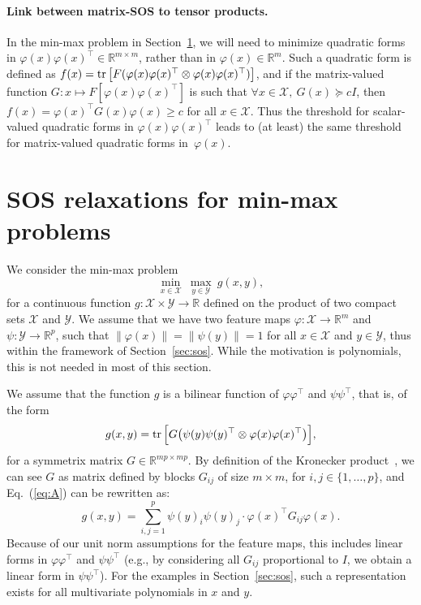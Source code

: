 \documentclass[11pt]{article}
\newcommand{\BEQ}{\begin{equation}}
\newcommand{\EEQ}{\end{equation}}
\newcommand{\tr}{\mathop{ \rm tr}}
\newcommand{\idm}{I}
\newcommand{\rb}{\mathbb{R}}
\newcommand{\mysec}[1]{Section~\ref{sec:#1}}
\newcommand{\eq}[1]{Eq.~(\ref{eq:#1})}
\def \X{{\mathcal X}}
\def \Y{{\mathcal Y}}
\begin{document}
\paragraph{Link between matrix-SOS to tensor products.} In the min-max problem in \mysec{sosminmax}, we will need to minimize quadratic forms in $\varphi(x) \varphi(x)^\top \in \rb^{m \times m}$, rather than in $\varphi(x) \in \rb^m$. Such a quadratic form is defined as $f(x) = \tr\big[ F ( \varphi(x) \varphi(x)^\top  \otimes \varphi(x) \varphi(x)^\top) \big]$, and if the matrix-valued function $G: x \mapsto F[ \varphi(x) \varphi(x)^\top]$ is such that $\forall x \in \X, \ G(x) \succcurlyeq c \idm$, then  
 $f(x)  = \varphi(x)^\top G(x) \varphi(x) \geqslant c$ for all $x \in \X$. Thus the threshold for scalar-valued quadratic forms in $\varphi(x)\varphi(x)^\top$ leads to (at least) the same threshold for matrix-valued quadratic forms in~$\varphi(x)$.
 

\section{SOS relaxations for min-max problems}
\label{sec:sosminmax}
  
We consider the min-max problem 
\BEQ
\label{eq:SP} \min_{x \in \X} \ \max_{y \in \Y} \ g(x,y),
\EEQ
for a continuous function $g: \X \times \Y \to \rb$ defined on the product of two compact sets $\X$ and $\Y$.
We assume that we have two feature maps $\varphi:\X \to \rb^m$  and $\psi: \Y \to \rb^p$, such that $\| \varphi(x)\|=\| \psi(y)\|=1$ for all $x \in \X$ and $y \in \Y$, thus within the framework of \mysec{sos}. While the motivation is polynomials, this is not needed in most of this section.

We assume that the function $g$ is a bilinear function of $\varphi \varphi^\top$ and $\psi \psi^\top$, that is,  of the form
\BEQ
\label{eq:A}
g(x,y) = \tr \Big[ G  \big( \psi(y)\psi(y)^\top \otimes \varphi(x)\varphi(x)^\top  \big) \Big],
\EEQ
for a symmetrix matrix $G \in \rb^{mp \times mp}$. 
By definition of the Kronecker product~\cite{golub83matrix}, we can see $G$ as matrix defined by blocks $G_{ij}$ of size $m \times m$, for $i,j \in \{1,\dots,p\}$, and \eq{A} can be rewritten as:
\[
g(x,y) = \sum_{i,j=1}^p \psi(y)_i \psi(y)_j \cdot \varphi(x)^\top G_{ij} \varphi(x).
\]
Because of our unit norm assumptions for the feature maps, this includes linear forms in $\varphi \varphi^\top$ and $\psi \psi^\top$ (e.g., by considering all $G_{ij}$ proportional to $\idm$, we obtain a linear form in $\psi \psi^\top$). For the examples in \mysec{sos}, such a representation exists for all multivariate polynomials in $x$ and $y$.
\end{document}
